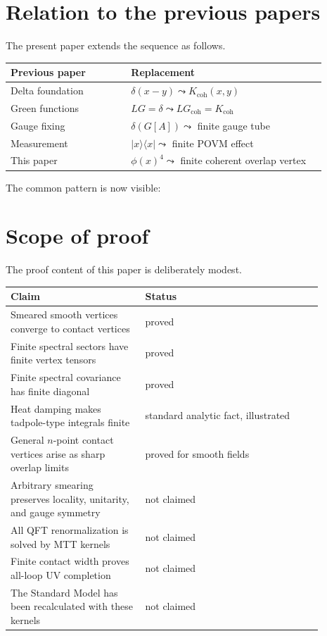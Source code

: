 \documentclass[11pt]{article}
\begin{document}
\section{Relation to the previous papers}

The present paper extends the sequence as follows.

\begin{center}
\begin{tabular}{p{0.34\linewidth}p{0.55\linewidth}}
\hline
\textbf{Previous paper} & \textbf{Replacement}\\
\hline
Delta foundation & \(\delta(x-y)\leadsto K_{\mathrm{coh}}(x,y)\)\\
Green functions & \(LG=\delta\leadsto LG_{\mathrm{coh}}=K_{\mathrm{coh}}\)\\
Gauge fixing & \(\delta(G[A])\leadsto\) finite gauge tube\\
Measurement & \(|x\rangle\langle x|\leadsto\) finite POVM effect\\
This paper & \(\phi(x)^4\leadsto\) finite coherent overlap vertex\\
\hline
\end{tabular}
\end{center}

The common pattern is now visible:
\begin{center}
\end{center}

\section{Scope of proof}

The proof content of this paper is deliberately modest.

\begin{center}
\begin{tabular}{p{0.38\linewidth}p{0.50\linewidth}}
\hline
\textbf{Claim} & \textbf{Status}\\
\hline
Smeared smooth vertices converge to contact vertices & proved\\
Finite spectral sectors have finite vertex tensors & proved\\
Finite spectral covariance has finite diagonal & proved\\
Heat damping makes tadpole-type integrals finite & standard analytic fact, illustrated\\
General \(n\)-point contact vertices arise as sharp overlap limits & proved for smooth fields\\
Arbitrary smearing preserves locality, unitarity, and gauge symmetry & not claimed\\
All QFT renormalization is solved by MTT kernels & not claimed\\
Finite contact width proves all-loop UV completion & not claimed\\
The Standard Model has been recalculated with these kernels & not claimed\\
\hline
\end{tabular}
\end{center}
\end{document}
